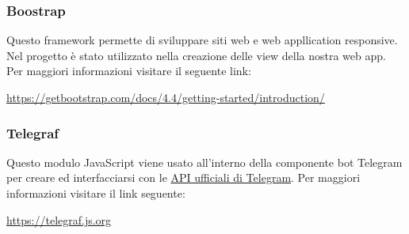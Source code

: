 		\subsubsection{Boostrap}
			Questo framework permette di sviluppare siti web e web appllication responsive. Nel progetto è stato utilizzato nella creazione delle view della nostra web app.
			\newline
			Per maggiori informazioni visitare il seguente link:
			\newline
			\begin{center}
				\url{https://getbootstrap.com/docs/4.4/getting-started/introduction/}
			\end{center}	
		\subsubsection{Telegraf}
			Questo modulo JavaScript viene usato all'interno della componente bot Telegram per creare ed interfacciarsi con le \href{https://core.telegram.org/bots/api}{API ufficiali di Telegram}.
			\newline
			Per maggiori informazioni visitare il link seguente:
			\newline
			\begin{center}
				\url{https://telegraf.js.org}
			\end{center}
	